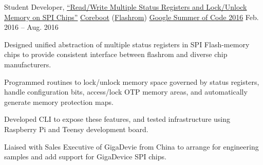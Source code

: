 \begin{cvexperience}
\cvposition
	{Student Developer, \href{https://drive.google.com/drive/u/1/folders/0B-Cccp-WWmeuUlh5M3pxT0cyQm8}{``Read/Write Multiple Status Registers and Lock/Unlock Memory on SPI Chips''}} %
	{\href{https://www.coreboot.org}{Coreboot} (\href{https://www.flashrom.org/Flashrom}{Flashrom})} %
	{} %
	{\href{https://summerofcode.withgoogle.com/archive/2016/projects/5439533130711040/}{Google Summer of Code 2016}} %
	{Feb. 2016 -- Aug. 2016  {\acvHeaderIconSep{}} {} } %
	{\begin{cvitems} %
		\item {Designed unified abstraction of multiple status registers in SPI Flash-memory chips to provide consistent interface between flashrom and diverse chip manufacturers.}
		\item {Programmed routines to lock/unlock memory space governed by status registers, handle configuration bits, access/lock OTP memory areas, and automatically generate memory protection maps.}
		\item {Developed CLI to expose these features, and tested infrastructure using Raspberry Pi and Teensy development board.}
  		\item {Liaised with Sales Executive of GigaDevie from China to arrange for engineering samples and add support for GigaDevice SPI chips.}
	\end{cvitems}}


\end{cvexperience}
